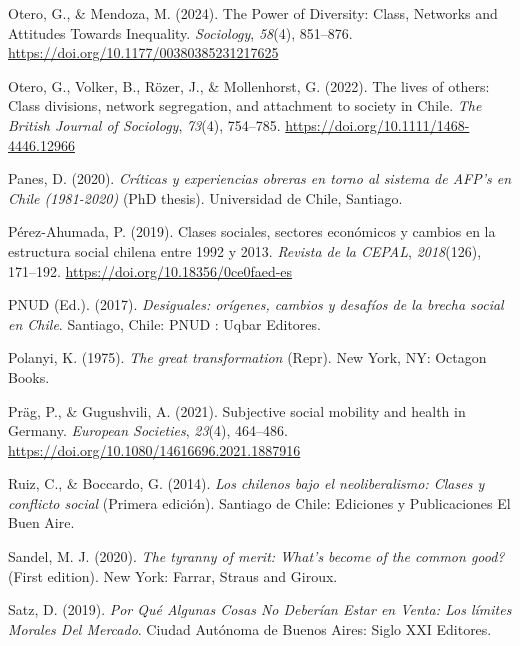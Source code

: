 \documentclass[
  13pt,
]{article}
\newlength{\cslhangindent}
\newenvironment{CSLReferences}[2] %
 {\begin{list}{}{%
  \setlength{\itemindent}{0pt}
  \setlength{\leftmargin}{0pt}
  \setlength{\parsep}{0pt}
  \ifodd #1
   \setlength{\leftmargin}{\cslhangindent}
   \setlength{\itemindent}{-1\cslhangindent}
  \fi
  \setlength{\itemsep}{#2\baselineskip}}}
 {\end{list}}
\begin{document}
\begin{CSLReferences}{1}{0}
Otero, G., \& Mendoza, M. (2024). The {Power} of {Diversity}: {Class},
{Networks} and {Attitudes Towards Inequality}. \emph{Sociology},
\emph{58}(4), 851--876. \url{https://doi.org/10.1177/00380385231217625}

Otero, G., Volker, B., Rözer, J., \& Mollenhorst, G. (2022). The lives
of others: {Class} divisions, network segregation, and attachment to
society in {Chile}. \emph{The British Journal of Sociology},
\emph{73}(4), 754--785. \url{https://doi.org/10.1111/1468-4446.12966}

Panes, D. (2020). \emph{Cr{í}ticas y experiencias obreras en torno al
sistema de {AFP}'s en {Chile} (1981-2020)} (PhD thesis). Universidad de
Chile, Santiago.

Pérez-Ahumada, P. (2019). {Clases sociales, sectores econ{ó}micos y
cambios en la estructura social chilena entre 1992 y 2013}.
\emph{Revista de la CEPAL}, \emph{2018}(126), 171--192.
\url{https://doi.org/10.18356/0ce0faed-es}

PNUD (Ed.). (2017). \emph{{Desiguales: or{í}genes, cambios y desaf{í}os
de la brecha social en Chile}}. Santiago, Chile: PNUD : Uqbar Editores.

Polanyi, K. (1975). \emph{The great transformation} (Repr). New York,
NY: Octagon Books.

Präg, P., \& Gugushvili, A. (2021). Subjective social mobility and
health in {Germany}. \emph{European Societies}, \emph{23}(4), 464--486.
\url{https://doi.org/10.1080/14616696.2021.1887916}

Ruiz, C., \& Boccardo, G. (2014). \emph{Los chilenos bajo el
neoliberalismo: Clases y conflicto social} (Primera edici{ó}n). Santiago
de Chile: Ediciones y Publicaciones El Buen Aire.

Sandel, M. J. (2020). \emph{The tyranny of merit: {What}'s become of the
common good?} (First edition). New York: {Farrar, Straus and Giroux}.

Satz, D. (2019). \emph{{Por Qu{é} Algunas Cosas No Deber{í}an Estar en
Venta: Los l{í}mites Morales Del Mercado}}. Ciudad Aut{ó}noma de Buenos
Aires: Siglo XXI Editores.


\end{CSLReferences}
\end{document}
